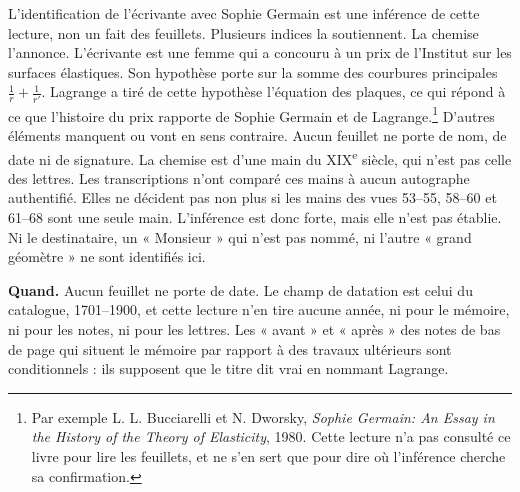 \documentclass[11pt,a4paper]{article}
\begin{document}
L'identification de l'écrivante avec Sophie Germain est une inférence de
cette lecture, non un fait des feuillets. Plusieurs indices la soutiennent. La
chemise l'annonce. L'écrivante est une femme qui a concouru à un prix de
l'Institut sur les surfaces élastiques. Son hypothèse porte sur la somme des
courbures principales \(\frac1r+\frac1{r'}\). Lagrange a tiré de cette
hypothèse l'équation des plaques, ce qui répond à ce que l'histoire du prix
rapporte de Sophie Germain et de Lagrange.\footnote{Par exemple L. L.
Bucciarelli et N. Dworsky, \emph{Sophie Germain: An Essay in the History of
the Theory of Elasticity}, 1980. Cette lecture n'a pas consulté ce livre pour
lire les feuillets, et ne s'en sert que pour dire où l'inférence cherche sa
confirmation.} D'autres éléments manquent ou vont en sens contraire. Aucun
feuillet ne porte de nom, de date ni de signature. La chemise est d'une main du
XIX\textsuperscript{e} siècle, qui n'est pas celle des lettres. Les
transcriptions n'ont comparé ces mains à aucun autographe authentifié. Elles ne
décident pas non plus si les mains des vues 53--55, 58--60 et 61--68 sont une
seule main. L'inférence est donc forte, mais elle n'est pas établie. Ni le
destinataire, un « Monsieur » qui n'est pas nommé, ni l'autre « grand
géomètre » ne sont identifiés ici.

\textbf{Quand.} Aucun feuillet ne porte de date. Le champ de datation est
celui du catalogue, 1701--1900, et cette lecture n'en tire aucune année, ni
pour le mémoire, ni pour les notes, ni pour les lettres. Les « avant » et
« après » des notes de bas de page qui situent le mémoire par rapport à des
travaux ultérieurs sont conditionnels : ils supposent que le titre dit vrai
en nommant Lagrange.
\end{document}
